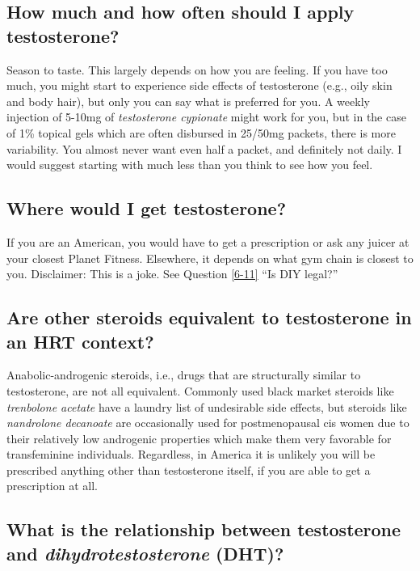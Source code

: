 \documentclass{article}
\begin{document}
\subsection{How much and how often should I apply testosterone?}

Season to taste. This largely depends on how you are feeling. If you have too much, you might start to experience side effects of testosterone (e.g., oily skin and body hair), but only you can say what is preferred for you. A weekly injection of 5-10mg of \textit{testosterone cypionate} might work for you, but in the case of 1\% topical gels which are often disbursed in 25/50mg packets, there is more variability. You almost never want even half a packet, and definitely not daily. I would suggest starting with much less than you think to see how you feel.

\subsection{Where would I get testosterone?}

If you are an American, you would have to get a prescription or ask any juicer at your closest Planet Fitness. Elsewhere, it depends on what gym chain is closest to you. Disclaimer: This is a joke. See Question \ref{6-11} “Is DIY legal?”

\subsection{Are other steroids equivalent to testosterone in an HRT context?}

Anabolic-androgenic steroids, i.e., drugs that are structurally similar to testosterone, are not all equivalent. Commonly used black market steroids like \textit{trenbolone acetate} have a laundry list of undesirable side effects, but steroids like \textit{nandrolone decanoate }are occasionally used for postmenopausal cis women due to their relatively low androgenic properties which make them very favorable for transfeminine individuals. Regardless, in America it is unlikely you will be prescribed anything other than testosterone itself, if you are able to get a prescription at all.

\subsection{What is the relationship between testosterone and \textit{dihydrotestosterone} (DHT)?}
\end{document}
